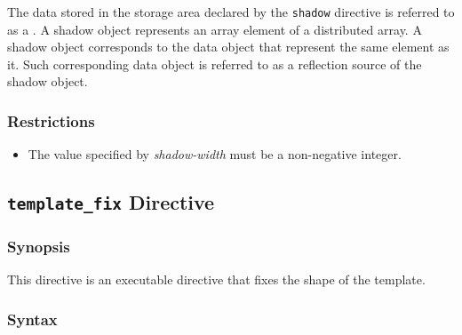 The data stored in the storage area declared by the {\tt shadow}
directive is referred to as a .
%
A shadow object represents an array element of a distributed array. A
shadow object corresponds to the data object that represent the same
element as it. Such corresponding data object is referred to as a
reflection source of the shadow object.



\subsubsection*{Restrictions}

\begin{itemize}
\item The value specified by {\it shadow-width} must be a non-negative
      integer.
\end{itemize}


\subsection{{\tt template\_fix} Directive}
\label{subsec:template_fix directive}

\subsubsection*{Synopsis}
This directive is an executable directive that fixes the shape of the
template. 

\subsubsection*{Syntax}

